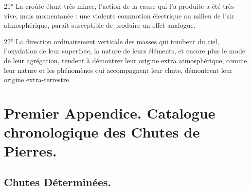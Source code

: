 \documentclass[a4paper, 12pt, oneside, french]{article}
\begin{document}
21° La croûte étant très-mince, l'action de la cause qui l'a produite a été très-vive, mais momentanée : une violente commotion électrique au milieu de l'air atmosphérique, paraît susceptible de produire un effet analogue.

22° La direction ordinairement verticale des masses qui tombent du ciel, l'oxydation de leur superficie, la nature de leurs éléments, et encore plus le mode de leur agrégation, tendent à démontrer leur origine extra atmosphérique, comme leur nature et les phénomènes qui accompagnent leur chute, démontrent leur origine extra-terrestre.
\clearpage
\section{Premier Appendice. Catalogue chronologique des Chutes de Pierres.}
\subsection{Chutes Déterminées.}
\end{document}
